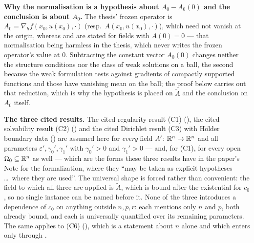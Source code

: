 \begin{lemma}
\noindent\textbf{Why the normalisation is a hypothesis about
$A_0-A_0(0)$ and the conclusion is about $A_0$.}  The thesis' frozen operator
is $A_0=\nabla_hf(x_0,u(x_0),\cdot)$ (resp.\ $A(x_0,u(x_0),\cdot)$), which need
not vanish at the origin, whereas  and
 are stated for fields with $A(0)=0$ --- that
normalisation being harmless in the thesis, which never writes the frozen
operator's value at $0$.  Subtracting the constant vector $A_0(0)$ changes
neither the structure conditions nor the class of weak solutions on a ball, the
second because the weak formulation tests against gradients of compactly
supported functions and those have vanishing mean on the ball; the proof below
carries out that reduction, which is why the hypothesis is placed on
$\widetilde A$ and the conclusion on $A_0$ itself.

\noindent\textbf{The three cited results.}  The cited regularity result (C1)
(), the cited solvability result (C2)
() and the cited Dirichlet result (C3) with
H\"older boundary data () are assumed here for
\emph{every} field $A'\colon\mathbb{R}^n\to\mathbb{R}^n$ and all parameters
$\varepsilon',\gamma_0',\gamma_1'$ with $\gamma_0'>0$ and $\gamma_1'>0$ ---
and, for (C1), for every open $\Omega_0\subseteq\mathbb{R}^n$ as well --- which are the
forms these three results have in the paper's Note for the formalization, where
they ``may be taken as explicit hypotheses \ldots\ where they are used''.  The
universal shape is forced rather than convenient: the field to which all three
are applied is $\widetilde A$, which is bound after the existential for $c_0$,
so no single instance can be named before it.  None of the three introduces a
dependence of $c_0$ on anything outside $n,p,r$: each mentions only $n$ and
$p$, both already bound, and each is universally quantified over its remaining
parameters.  The same applies to (C6) (),
which is a statement about $n$ alone and which enters only through
.
\end{lemma}
